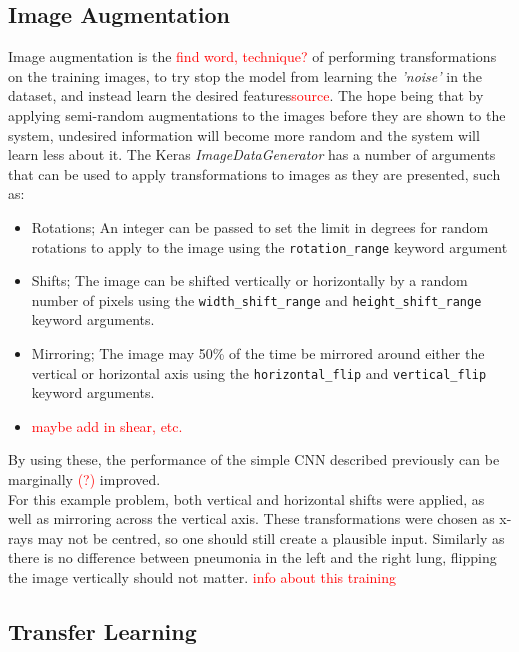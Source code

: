 \documentclass[12pt,a4paper,titlepage,twoside]{report}
\newcommand\todo[1]{\textcolor{red}{#1}}
\begin{document}
	\subsection{Image Augmentation}
	Image augmentation is the \todo{find word, technique?} of performing transformations on the training images, to try stop the model from learning the  \textit{'noise'} in the dataset, and instead learn the desired features\todo{source}. The hope being that by applying semi-random augmentations to the images before they are shown to the system, undesired information will become more random and the system will learn less about it. The Keras \textit{ImageDataGenerator} has a number of arguments that can be used to apply transformations to images as they are presented, such as:
	\begin{itemize}
		\item Rotations; An integer can be passed to set the limit in degrees for random rotations to apply to the image using the \verb!rotation_range! keyword argument
		\item Shifts; The image can be shifted vertically or horizontally by a random number of pixels using the \verb!width_shift_range! and \verb!height_shift_range! keyword arguments.
		\item Mirroring; The image may 50\% of the time be mirrored around either the vertical or horizontal axis using the \verb!horizontal_flip! and \verb!vertical_flip! keyword arguments.
		\item \todo{maybe add in shear, etc.}
	\end{itemize}
	By using these, the performance of the simple CNN described previously can be marginally \todo{(?)} improved. \\ For this example problem, both vertical and horizontal shifts were applied, as well as mirroring across the vertical axis. These transformations were chosen as x-rays may not be centred, so one should still create a plausible input. Similarly as there is no difference between pneumonia in the left and the right lung, flipping the image vertically should not matter.
	\todo{info about this training}
	\subsection{Transfer Learning}
	

\printbibliography
\end{document}
